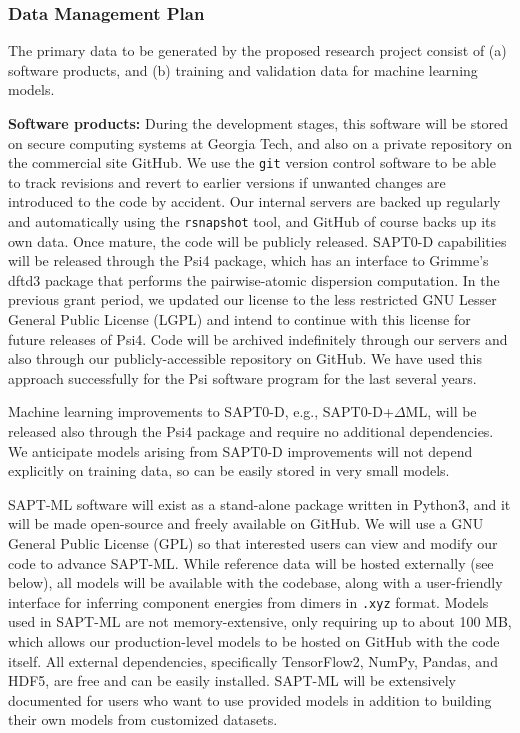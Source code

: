 \documentclass[12pt]{article}
\begin{document}
\subsubsection*{Data Management Plan}

The primary data to be generated by the proposed research project
consist of (a) software products, and (b) training and validation data
for machine learning models.

{\bf Software products:} During the development stages, this software
will be stored on secure computing systems at Georgia Tech, and also
on a private repository on the commercial site GitHub.  We use the
{\tt git} version control software to be able to track revisions and
revert to earlier versions if unwanted changes are introduced to the
code by accident.  Our internal servers are backed up regularly and
automatically using the {\tt rsnapshot} tool, and GitHub of course
backs up its own data.  Once mature, the code will be publicly released.
SAPT0-D capabilities will be released through the {\sc
Psi4} package, which has an interface to Grimme's {\sc dftd3} package
that performs the pairwise-atomic dispersion computation.  In the
previous grant period, we updated our license to the less restricted
GNU Lesser General Public License (LGPL) and intend to continue with
this license for future releases of {\sc Psi4}.  Code will be archived
indefinitely through our servers and also through our publicly-accessible
repository on GitHub.  We have used this approach successfully for the
{\sc Psi} software program for the last several years.

Machine learning improvements to SAPT0-D, e.g., SAPT0-D+$\Delta$ML,
will be released also through the {\sc Psi4} package and require no
additional dependencies. We anticipate models arising from SAPT0-D
improvements will not depend explicitly on training data, so can be
easily stored in very small models.

SAPT-ML software will exist as a stand-alone package written in Python3,
and it will be made open-source and freely available on GitHub. We
will use a GNU General Public License (GPL) so that interested users
can view and modify our code to advance SAPT-ML. While reference data
will be hosted externally (see below), all models will be available
with the codebase, along with a user-friendly interface for inferring
component energies from dimers in {\tt .xyz} format.  Models used in
SAPT-ML are not memory-extensive, only requiring up to about 100 MB,
which allows our production-level models to be hosted on GitHub with
the code itself.  All external dependencies, specifically TensorFlow2,
NumPy, Pandas, and HDF5, are free and can be easily installed. SAPT-ML
will be extensively documented for users who want to use provided models
in addition to building their own models from customized datasets.
\end{document}
